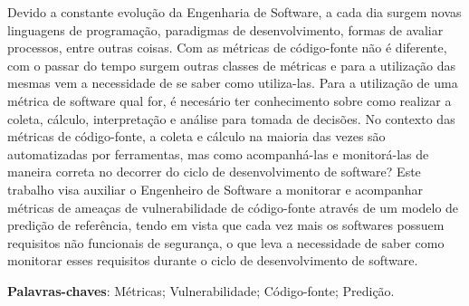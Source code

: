 \begin{resumo}

Devido a constante evolução da Engenharia de Software, a cada dia surgem 
novas linguagens de programação, paradigmas de desenvolvimento, formas de
avaliar processos, entre outras coisas. Com as métricas de código-fonte não 
é diferente, com o passar do tempo surgem outras classes de métricas e para
a utilização das mesmas vem a necessidade de se saber como utiliza-las. Para a
utilização de uma métrica de software qual for, é necesário ter conhecimento
sobre como realizar a coleta, cálculo, interpretação e análise para tomada de
decisões. No contexto das métricas de código-fonte, a coleta e cálculo na
maioria das vezes são automatizadas por ferramentas, mas como acompanhá-las e
monitorá-las de maneira correta no decorrer do ciclo de desenvolvimento de
software? Este trabalho visa auxiliar o Engenheiro de Software a monitorar e
acompanhar métricas de ameaças de vulnerabilidade de código-fonte através de um
modelo de predição de referência, tendo em vista que cada vez mais os softwares
possuem requisitos não funcionais de segurança, o que leva a necessidade de saber
como monitorar esses requisitos durante o ciclo de desenvolvimento de software.

 \vspace{\onelineskip}
    
 \noindent
 \textbf{Palavras-chaves}: Métricas; Vulnerabilidade; Código-fonte; Predição.
\end{resumo}
